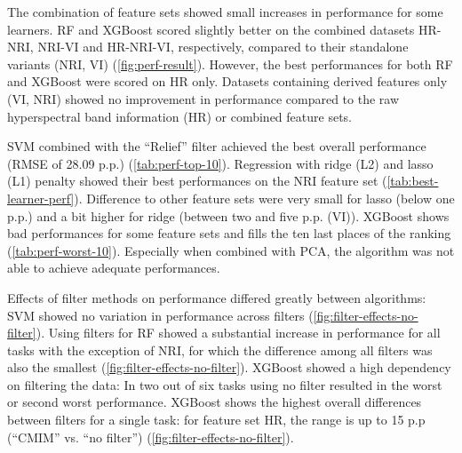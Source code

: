 \documentclass[remotesensing,article,submit,moreauthors,pdftex]{Definitions/mdpi}
\begin{document}
The combination of feature sets showed small increases in performance for some learners.
RF and XGBoost scored slightly better on the combined datasets HR-NRI, NRI-VI and HR-NRI-VI, respectively, compared to their standalone variants (NRI, VI) (\autoref{fig:perf-result}).
However, the best performances for both RF and XGBoost were scored on HR only.
Datasets containing derived features only (VI, NRI) showed no improvement in performance compared to the raw hyperspectral band information (HR) or combined feature sets.

SVM combined with the \enquote{Relief} filter achieved the best overall performance (RMSE of 28.09 p.p.) (\autoref{tab:perf-top-10}).
Regression with ridge (L2) and lasso (L1) penalty showed their best performances on the NRI feature set (\autoref{tab:best-learner-perf}).
Difference to other feature sets were very small for lasso (below one p.p.) and a bit higher for ridge (between two and five p.p. (VI)).
XGBoost shows bad performances for some feature sets and fills the ten last places of the ranking (\autoref{tab:perf-worst-10}).
Especially when combined with PCA, the algorithm was not able to achieve adequate performances.

Effects of filter methods on performance differed greatly between algorithms:
SVM showed no variation in performance across filters (\autoref{fig:filter-effects-no-filter}).
Using filters for RF showed a substantial increase in performance for all tasks with the exception of NRI, for which the difference among all filters was also the smallest (\autoref{fig:filter-effects-no-filter}).
XGBoost showed a high dependency on filtering the data: In two out of six tasks using no filter resulted in the worst or second worst performance.
XGBoost shows the highest overall differences between filters for a single task: for feature set HR, the range is up to 15 p.p (\enquote{CMIM} vs. \enquote{no filter}) (\autoref{fig:filter-effects-no-filter}).
\end{document}
